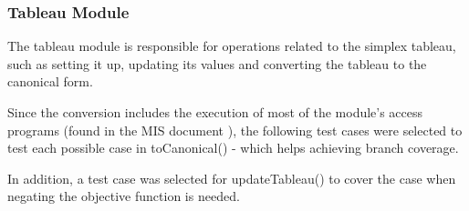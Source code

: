 \documentclass[12pt, titlepage]{article}
\begin{document}
\subsubsection{Tableau Module}

The tableau module is responsible for operations related to the simplex 
tableau, such as setting it up, updating its values and converting the tableau 
to the canonical form. 

Since the conversion includes the execution of most of the module's access 
programs (found in the MIS document \cite{losms-mis}), the following test cases 
were selected to test each possible case in toCanonical() - which helps 
achieving branch coverage.

In addition, a test case was selected for updateTableau() to cover the case 
when negating the objective function is needed.
\end{document}

